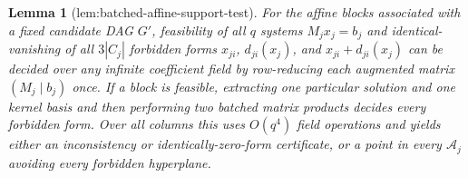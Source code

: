 \documentclass{article}
\newtheorem{lemma}{Lemma}
\begin{document}
\begin{lemma}[lem:batched-affine-support-test]\label{lem:batched-affine-support-test}
For the affine blocks associated with a fixed candidate DAG \(G'\), feasibility of all \(q\) systems \(M_jx_j=b_j\) and identical-vanishing of all \(3|C_j|\) forbidden forms \(x_{ji}\), \(d_{ji}(x_j)\), and \(x_{ji}+d_{ji}(x_j)\) can be decided over any infinite coefficient field by row-reducing each augmented matrix \((M_j\mid b_j)\) once.  If a block is feasible, extracting one particular solution and one kernel basis and then performing two batched matrix products decides every forbidden form.  Over all columns this uses \(O(q^4)\) field operations and yields either an inconsistency or identically-zero-form certificate, or a point in every \(\mathcal A_j\) avoiding every forbidden hyperplane.
\end{lemma}
\end{document}
